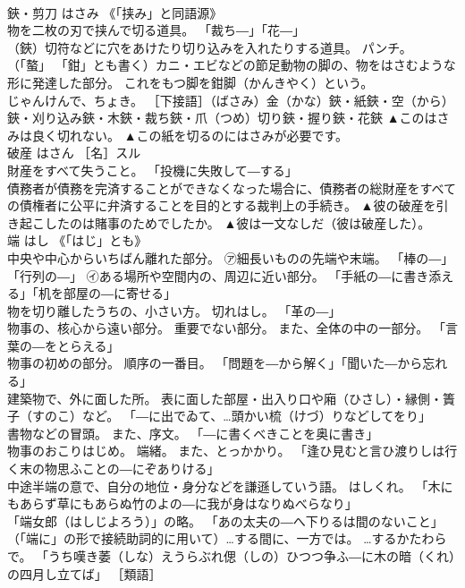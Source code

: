 \documentclass[8pt]{extreport}
\begin{document}
\begin{CJK}{UTF8}{min}
\\	鋏・剪刀	はさみ	《「挟み」と同語源》 
\\	物を二枚の刃で挟んで切る道具。 「裁ち―」「花―」 
\\	（鋏）切符などに穴をあけたり切り込みを入れたりする道具。 パンチ。 
\\	（「螯」 「鉗」とも書く）カニ・エビなどの節足動物の脚の、物をはさむような形に発達した部分。 これをもつ脚を鉗脚（かんきやく）という。 
\\	じゃんけんで、ちょき。 ［下接語］（ばさみ）金（かな）鋏・紙鋏・空（から）鋏・刈り込み鋏・木鋏・裁ち鋏・爪（つめ）切り鋏・握り鋏・花鋏	▲このはさみは良く切れない。 ▲この紙を切るのにはさみが必要です。
\\	破産	はさん	［名］スル 
\\	財産をすべて失うこと。 「投機に失敗して―する」 
\\	債務者が債務を完済することができなくなった場合に、債務者の総財産をすべての債権者に公平に弁済することを目的とする裁判上の手続き。	▲彼の破産を引き起こしたのは賭事のためでしたか。 ▲彼は一文なしだ（彼は破産した）。
\\	端	はし	《「はじ」とも》 
\\	中央や中心からいちばん離れた部分。 ㋐細長いものの先端や末端。 「棒の―」「行列の―」 ㋑ある場所や空間内の、周辺に近い部分。 「手紙の―に書き添える」「机を部屋の―に寄せる」 
\\	物を切り離したうちの、小さい方。 切れはし。 「革の―」 
\\	物事の、核心から遠い部分。 重要でない部分。 また、全体の中の一部分。 「言葉の―をとらえる」 
\\	物事の初めの部分。 順序の一番目。 「問題を―から解く」「聞いた―から忘れる」 
\\	建築物で、外に面した所。 表に面した部屋・出入り口や廂（ひさし）・縁側・簀子（すのこ）など。 「―に出でゐて、…頭かい梳（けづ）りなどしてをり」 
\\	書物などの冒頭。 また、序文。 「―に書くべきことを奥に書き」 
\\	物事のおこりはじめ。 端緒。 また、とっかかり。 「逢ひ見むと言ひ渡りしは行く末の物思ふことの―にぞありける」 
\\	中途半端の意で、自分の地位・身分などを謙遜していう語。 はしくれ。 「木にもあらず草にもあらぬ竹のよの―に我が身はなりぬべらなり」 
\\	「端女郎（はしじよろう）」の略。 「あの太夫の―へ下りるは間のないこと」 
\\	（「端に」の形で接続助詞的に用いて）…する間に、一方では。 …するかたわらで。 「うち嘆き萎（しな）えうらぶれ偲（しの）ひつつ争ふ―に木の暗（くれ）の四月し立てば」 ［類語］

\end{CJK}
\end{document}
